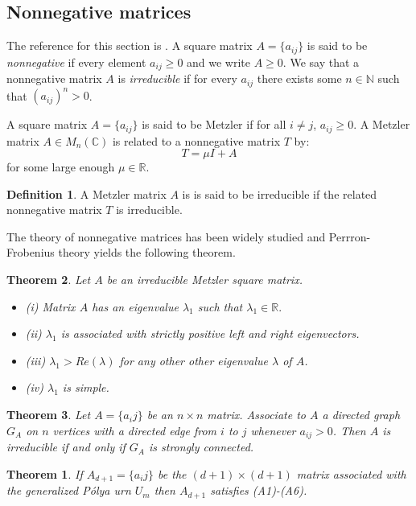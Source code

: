 \documentclass[8pt]{article} %
\newtheorem{theorem}{Theorem}
\newtheorem{thm}{Theorem}[section]
\theoremstyle{definition}
\newtheorem{defn}[thm]{Definition}
\begin{document}
\subsection{Nonnegative matrices}
The reference for this section is \cite{Nonnegative matrices and Markov Chains}.
A square matrix $A = \{a_{ij}\}$ is said to be \emph{nonnegative} if every element $a_{ij} \geq 0$ and we write $A \geq 0$.  We say that a nonnegative matrix $A$ is \emph{irreducible} if for every $a_{ij}$ there exists some $n \in \mathbb{N}$ such that $(a_{ij})^n > 0$. 

A square matrix $A=\{a_{ij}\}$ is said to be Metzler if for all $i \neq j$, $a_{ij} \geq 0$. A Metzler matrix $A \in M_{n}(\mathbb{C})$ is related to a nonnegative matrix $T$ by:
\[T = \mu I + A\]
for some large enough $\mu \in \mathbb{R}$.

\begin{defn}\label{defn:Met}
 A Metzler matrix $A$ is is said to be irreducible if the related nonnegative matrix $T$ is irreducible.
\end{defn}

The theory of nonnegative matrices has been widely studied and Perrron-Frobenius theory yields the following theorem.

\begin{thm}\label{thm:ev}
 Let $A$ be an irreducible Metzler square matrix.  
 \begin{itemize}
  \item(i) Matrix $A$ has an eigenvalue $\lambda_1$ such that $\lambda_1 \in \mathbb{R}.$
  \item(ii) $\lambda_1$ is associated with strictly positive left and right eigenvectors.
  \item(iii) $\lambda_1 > Re(\lambda)$ for any other other eigenvalue $\lambda$ of $A$. 
  \item(iv) $\lambda_{1}$ is simple.
 \end{itemize}
\end{thm}

\begin{thm}\cite{addcitation:applied graph theory - wai-kai chen}\label{thm:gt}
 Let $A = \{a_ij\}$ be an $n \times n$ matrix.  Associate to $A$ a directed graph $G_A$ on $n$ vertices with a directed edge from $i$ to $j$ whenever $ a_{ij}>0$.  Then $A$ is irreducible if and only if $G_A$ is strongly connected.
\end{thm}



\begin{theorem}\label{thm:A1}
If $A_{d+1} = \{a_ij\}$ be the $(d+1) \times (d+1)$ matrix associated with the generalized P\'{o}lya urn $U_m$ then $A_{d+1}$ satisfies (A1)-(A6). 
\end{theorem}
\end{document}
